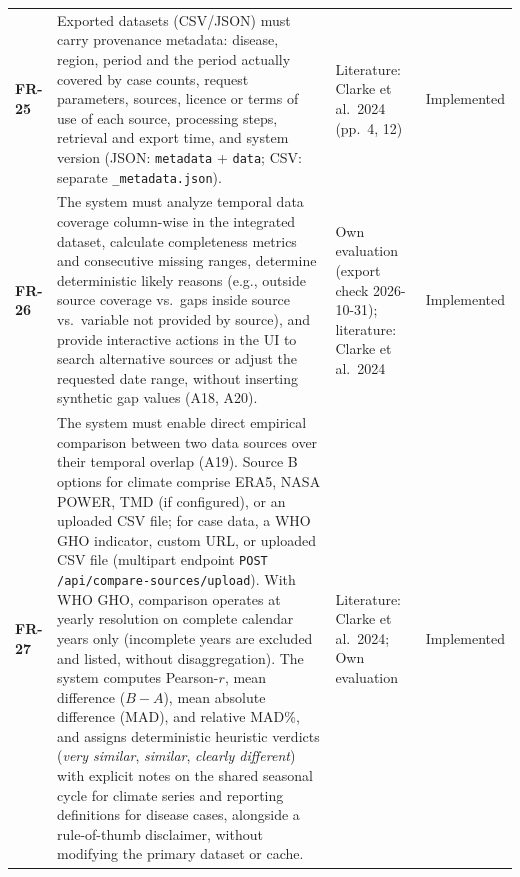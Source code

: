 \documentclass[11pt,a4paper]{article}
\begin{document}
\begin{longtable}{@{}>{\bfseries}p{1.6cm} L{7.4cm} L{3.6cm} L{2.4cm}@{}}
FR-25 & Exported datasets (CSV/JSON) must carry provenance metadata: disease, region, period and the period actually covered by case counts, request parameters, sources, licence or terms of use of each source, processing steps, retrieval and export time, and system version (JSON: \texttt{metadata} + \texttt{data}; CSV: separate \texttt{\_metadata.json}). & Literature: Clarke et al.\ 2024 (pp.~4, 12) & Implemented \\
FR-26 & The system must analyze temporal data coverage column-wise in the integrated dataset, calculate completeness metrics and consecutive missing ranges, determine deterministic likely reasons (e.g., outside source coverage vs.\ gaps inside source vs.\ variable not provided by source), and provide interactive actions in the UI to search alternative sources or adjust the requested date range, without inserting synthetic gap values (A18, A20). & Own evaluation (export check 2026-10-31); literature: Clarke et al.\ 2024 & Implemented \\
FR-27 & The system must enable direct empirical comparison between two data sources over their temporal overlap (A19). Source B options for climate comprise ERA5, NASA POWER, TMD (if configured), or an uploaded CSV file; for case data, a WHO GHO indicator, custom URL, or uploaded CSV file (multipart endpoint \texttt{POST /api/compare-sources/upload}). With WHO GHO, comparison operates at yearly resolution on complete calendar years only (incomplete years are excluded and listed, without disaggregation). The system computes Pearson-$r$, mean difference ($B - A$), mean absolute difference (MAD), and relative MAD\%, and assigns deterministic heuristic verdicts (\emph{very similar}, \emph{similar}, \emph{clearly different}) with explicit notes on the shared seasonal cycle for climate series and reporting definitions for disease cases, alongside a rule-of-thumb disclaimer, without modifying the primary dataset or cache. & Literature: Clarke et al.\ 2024; Own evaluation & Implemented \\

\end{longtable}
\end{document}
